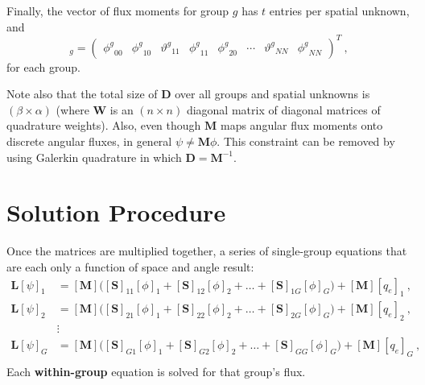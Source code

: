 \documentclass[12pt]{article}
\newcommand{\ve}[1]{\ensuremath{\mathbf{#1}}}
\newcommand{\even}{\ensuremath{\phi^g}}
\newcommand{\odd}{\ensuremath{\vartheta^g}}
\begin{document}
Finally, the
vector of flux moments for group $g$ has $t$ entries per spatial unknown, and
%
\begin{equation} 
[\phi]_g = \begin{pmatrix} \even_{00} & \even_{10} & \odd_{11}
& \even_{11} & \even_{20} & \cdots & \odd_{NN} & \even_{NN}
  \end{pmatrix}^T\:,
\end{equation} for each group.

Note also that the total size of $\ve{D}$ over all
groups and spatial unknowns is $(\beta \times \alpha)$ (where $\ve{W}$ is an $(n\times n)$ diagonal matrix of diagonal matrices of quadrature
weights).  Also, even though $\ve{M}$ maps
angular flux moments onto discrete angular fluxes, in general
$\psi\ne\ve{M}\phi$.  This constraint can be removed by using Galerkin
quadrature in which $\ve{D} = \ve{M}^{-1}$.


\section*{Solution Procedure}
Once the matrices are multiplied together, a series of single-group equations that are each only a function of space and angle result:
%
\begin{equation}
  \begin{aligned}
    \ve{L}[\psi]_1 &= [\ve{M}]\bigl([\ve{S}]_{11}[\phi]_1 + 
    [\ve{S}]_{12}[\phi]_2 + \ldots + [\ve{S}]_{1G}[\phi]_G\bigr) + 
    [\ve{M}][q_{e}]_1\:, \\
    \ve{L}[\psi]_2 &= [\ve{M}]\bigl([\ve{S}]_{21}[\phi]_1 + 
    [\ve{S}]_{22}[\phi]_2 + \ldots + [\ve{S}]_{2G}[\phi]_G\bigr) + 
    [\ve{M}][q_{e}]_2\:, \\
    &\vdots\\
    \ve{L}[\psi]_G &= [\ve{M}]\bigl([\ve{S}]_{G1}[\phi]_1 + 
    [\ve{S}]_{G2}[\phi]_2 + \ldots + [\ve{S}]_{GG}[\phi]_G\bigr) + 
       [\ve{M}][q_{e}]_G\:, \\
  \end{aligned}
  \label{eq:group-equations}
\end{equation}
%
Each \textbf{within-group} equation is solved for that group's flux. 
\end{document}

